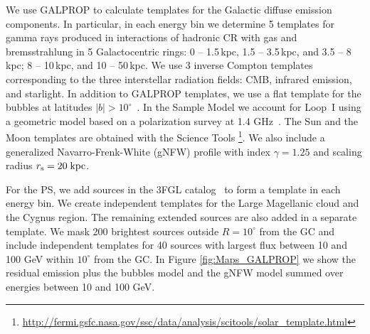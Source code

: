 We use GALPROP to calculate templates for the Galactic diffuse emission components.
In particular, in each energy bin we determine 5 templates for gamma rays produced in 
interactions of hadronic CR with gas and bremsstrahlung in 5 Galactocentric rings: 
0 -- 1.5\,kpc, 1.5 -- 3.5\,kpc, and 3.5 -- 8\,kpc; 8 -- 10\,kpc, and 10 -- 50\,kpc. 
We use 3 inverse Compton templates corresponding to the three interstellar radiation fields: CMB, 
infrared emission, and starlight.
In addition to GALPROP templates, we use a flat template for the \Fermi bubbles at latitudes $|b| > 10^\circ$~\citep{2014ApJ...793...64A}. 
In the Sample Model we account for Loop~I using a geometric model \citep[e.g., Figure 2 of][]{2014ApJ...793...64A}
based on a polarization survey at 1.4 GHz~\citep{Wolleben:2007pq}.
The Sun \citep{2007Ap&SS.309..359O, 2006ApJ...652L..65M, 2008A&A...480..847O, 2013arXiv1307.0197J} and the Moon templates are obtained with the \Fermi Science Tools%
\footnote{\url{http://fermi.gsfc.nasa.gov/ssc/data/analysis/scitools/solar_template.html}}.
We also include a generalized Navarro-Frenk-White (gNFW) profile with index $\gamma = 1.25$ and scaling radius $r_{\rm s} = 20\;{\rm kpc}$.


For the PS, we add sources in the 3FGL catalog~\citep{2015ApJS..218...23A} to form a template
in each energy bin.
We create independent templates for the Large Magellanic cloud and the Cygnus region.
The remaining extended sources are also added in a separate template.
We mask 200 brightest sources outside $R = 10^\circ$ from the GC and include independent templates
for 40 sources with largest flux between 10 and 100 GeV within $10^\circ$ from the GC.
In Figure \ref{fig:Maps_GALPROP} we show the residual emission plus the \Fermi bubbles model and the gNFW model summed over energies between 10 and 100 GeV.




